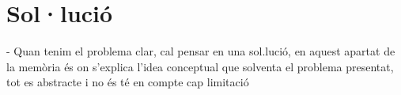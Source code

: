 \section{Sol·lució}

        - Quan tenim el problema clar, cal pensar en una
        sol.lució, en aquest apartat de la memòria és on
        s'explica l'idea conceptual que solventa el
        problema presentat, tot es abstracte i no és té en
        compte cap limitació
